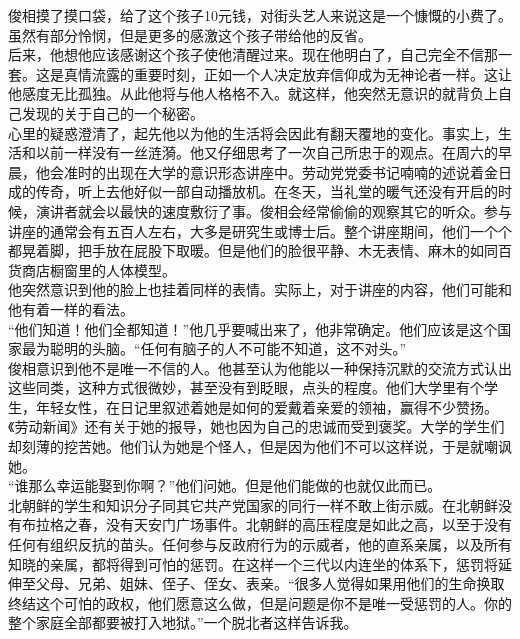 俊相摸了摸口袋，给了这个孩子10元钱，对街头艺人来说这是一个慷慨的小费了。虽然有部分怜悯，但是更多的感激这个孩子带给他的反省。\\

后来，他想他应该感谢这个孩子使他清醒过来。现在他明白了，自己完全不信那一套。这是真情流露的重要时刻，正如一个人决定放弃信仰成为无神论者一样。这让他感度无比孤独。从此他将与他人格格不入。就这样，他突然无意识的就背负上自己发现的关于自己的一个秘密。\\

心里的疑惑澄清了，起先他以为他的生活将会因此有翻天覆地的变化。事实上，生活和以前一样没有一丝涟漪。他又仔细思考了一次自己所忠于的观点。在周六的早晨，他会准时的出现在大学的意识形态讲座中。劳动党党委书记喃喃的述说着金日成的传奇，听上去他好似一部自动播放机。在冬天，当礼堂的暖气还没有开启的时候，演讲者就会以最快的速度敷衍了事。俊相会经常偷偷的观察其它的听众。参与讲座的通常会有五百人左右，大多是研究生或博士后。整个讲座期间，他们一个个都晃着脚，把手放在屁股下取暖。但是他们的脸很平静、木无表情、麻木的如同百货商店橱窗里的人体模型。\\

他突然意识到他的脸上也挂着同样的表情。实际上，对于讲座的内容，他们可能和他有着一样的看法。\\

“他们知道！他们全都知道！”他几乎要喊出来了，他非常确定。他们应该是这个国家最为聪明的头脑。“任何有脑子的人不可能不知道，这不对头。”\\

俊相意识到他不是唯一不信的人。他甚至认为他能以一种保持沉默的交流方式认出这些同类，这种方式很微妙，甚至没有到眨眼，点头的程度。他们大学里有个学生，年轻女性，在日记里叙述着她是如何的爱戴着亲爱的领袖，赢得不少赞扬。《劳动新闻》还有关于她的报导，她也因为自己的忠诚而受到褒奖。大学的学生们却刻薄的挖苦她。他们认为她是个怪人，但是因为他们不可以这样说，于是就嘲讽她。\\

“谁那么幸运能娶到你啊？”他们问她。但是他们能做的也就仅此而已。\\

北朝鲜的学生和知识分子同其它共产党国家的同行一样不敢上街示威。在北朝鲜没有布拉格之春，没有天安门广场事件。北朝鲜的高压程度是如此之高，以至于没有任何有组织反抗的苗头。任何参与反政府行为的示威者，他的直系亲属，以及所有知晓的亲属，都将得到可怕的惩罚。在这样一个三代以内连坐的体系下，惩罚将延伸至父母、兄弟、姐妹、侄子、侄女、表亲。“很多人觉得如果用他们的生命换取终结这个可怕的政权，他们愿意这么做，但是问题是你不是唯一受惩罚的人。你的整个家庭全部都要被打入地狱。”一个脱北者这样告诉我。\\

